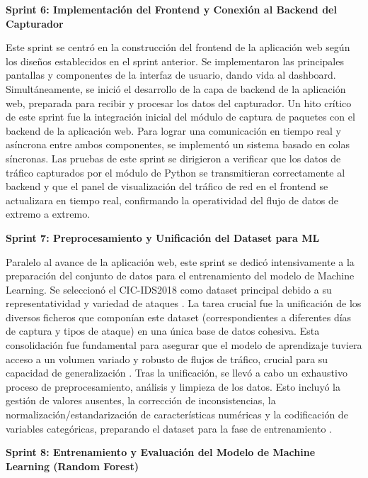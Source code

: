 \textbf{Sprint 6: Implementación del Frontend y Conexión al Backend del Capturador}

Este sprint se centró en la construcción del frontend de la aplicación web según los diseños establecidos en el sprint anterior. Se implementaron las principales pantallas y componentes de la interfaz de usuario, dando vida al dashboard. Simultáneamente, se inició el desarrollo de la capa de backend de la aplicación web, preparada para recibir y procesar los datos del capturador. Un hito crítico de este sprint fue la integración inicial del módulo de captura de paquetes con el backend de la aplicación web. Para lograr una comunicación en tiempo real y asíncrona entre ambos componentes, se implementó un sistema basado en colas síncronas. Las pruebas de este sprint se dirigieron a verificar que los datos de tráfico capturados por el módulo de Python se transmitieran correctamente al backend y que el panel de visualización del tráfico de red en el frontend se actualizara en tiempo real, confirmando la operatividad del flujo de datos de extremo a extremo.

\textbf{Sprint 7: Preprocesamiento y Unificación del Dataset para ML}

Paralelo al avance de la aplicación web, este sprint se dedicó intensivamente a la preparación del conjunto de datos para el entrenamiento del modelo de Machine Learning. Se seleccionó el CIC-IDS2018 como dataset principal debido a su representatividad y variedad de ataques \cite{PolaniaArias2021EvaluacionMLIDS}. La tarea crucial fue la unificación de los diversos ficheros que componían este dataset (correspondientes a diferentes días de captura y tipos de ataque) en una única base de datos cohesiva. Esta consolidación fue fundamental para asegurar que el modelo de aprendizaje tuviera acceso a un volumen variado y robusto de flujos de tráfico, crucial para su capacidad de generalización \cite{PolaniaArias2021EvaluacionMLIDS}. Tras la unificación, se llevó a cabo un exhaustivo proceso de preprocesamiento, análisis y limpieza de los datos. Esto incluyó la gestión de valores ausentes, la corrección de inconsistencias, la normalización/estandarización de características numéricas y la codificación de variables categóricas, preparando el dataset para la fase de entrenamiento \cite{James2013ISLR}.

\textbf{Sprint 8: Entrenamiento y Evaluación del Modelo de Machine Learning (Random Forest)}

